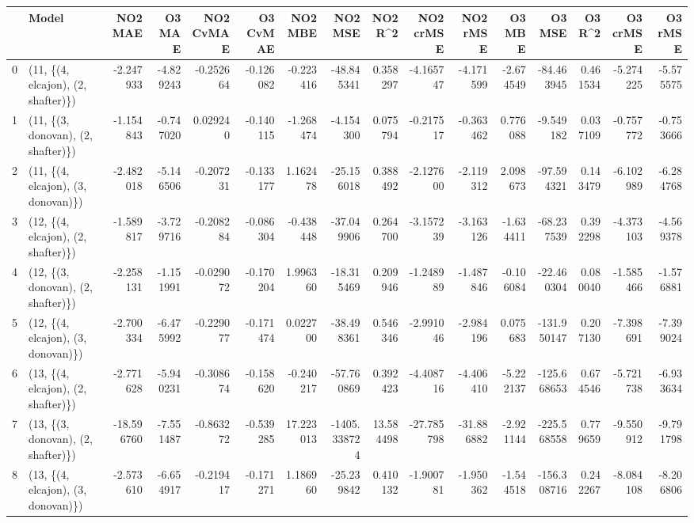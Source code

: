 \begin{tabular}{llrrrrrrrrrrrrrr}
\toprule
{} &                               Model &    NO2 MAE &     O3 MAE &  NO2 CvMAE &  O3 CvMAE &    NO2 MBE &      NO2 MSE &    NO2 R\textasciicircum2 &  NO2 crMSE &   NO2 rMSE &     O3 MBE &      O3 MSE &    O3 R\textasciicircum2 &   O3 crMSE &    O3 rMSE \\
\midrule
0  &  (11, \{(4, elcajon), (2, shafter)\}) &  -2.247933 &  -4.829243 &  -0.252664 & -0.126082 &  -0.223416 &   -48.845341 &   0.358297 &  -4.165747 &  -4.171599 &  -2.674549 &  -84.463945 &  0.461534 &  -5.274225 &  -5.575575 \\
1  &  (11, \{(3, donovan), (2, shafter)\}) &  -1.154843 &  -0.747020 &   0.029240 & -0.140115 &  -1.268474 &    -4.154300 &   0.075794 &  -0.217517 &  -0.363462 &   0.776088 &   -9.549182 &  0.037109 &  -0.757772 &  -0.753666 \\
2  &  (11, \{(4, elcajon), (3, donovan)\}) &  -2.482018 &  -5.146506 &  -0.207231 & -0.133177 &   1.162478 &   -25.156018 &   0.388492 &  -2.127600 &  -2.119312 &   2.098673 &  -97.594321 &  0.143479 &  -6.102989 &  -6.284768 \\
3  &  (12, \{(4, elcajon), (2, shafter)\}) &  -1.589817 &  -3.729716 &  -0.208284 & -0.086304 &  -0.438448 &   -37.049906 &   0.264700 &  -3.157239 &  -3.163126 &  -1.634411 &  -68.237539 &  0.392298 &  -4.373103 &  -4.569378 \\
4  &  (12, \{(3, donovan), (2, shafter)\}) &  -2.258131 &  -1.151991 &  -0.029072 & -0.170204 &   1.996360 &   -18.315469 &   0.209946 &  -1.248989 &  -1.487846 &  -0.106084 &  -22.460304 &  0.080040 &  -1.585466 &  -1.576881 \\
5  &  (12, \{(4, elcajon), (3, donovan)\}) &  -2.700334 &  -6.475992 &  -0.229077 & -0.171474 &   0.022700 &   -38.498361 &   0.546346 &  -2.991046 &  -2.984196 &   0.075683 & -131.950147 &  0.207130 &  -7.398691 &  -7.399024 \\
6  &  (13, \{(4, elcajon), (2, shafter)\}) &  -2.771628 &  -5.940231 &  -0.308674 & -0.158620 &  -0.240217 &   -57.760869 &   0.392423 &  -4.408716 &  -4.406410 &  -5.222137 & -125.668653 &  0.674546 &  -5.721738 &  -6.933634 \\
7  &  (13, \{(3, donovan), (2, shafter)\}) & -18.596760 &  -7.551487 &  -0.863272 & -0.539285 &  17.223013 & -1405.338724 &  13.584498 & -27.785798 & -31.886882 &  -2.921144 & -225.568558 &  0.779659 &  -9.550912 &  -9.791798 \\
8  &  (13, \{(4, elcajon), (3, donovan)\}) &  -2.573610 &  -6.654917 &  -0.219417 & -0.171271 &   1.186960 &   -25.239842 &   0.410132 &  -1.900781 &  -1.950362 &  -1.544518 & -156.308716 &  0.242267 &  -8.084108 &  -8.206806 \\

\end{tabular}
